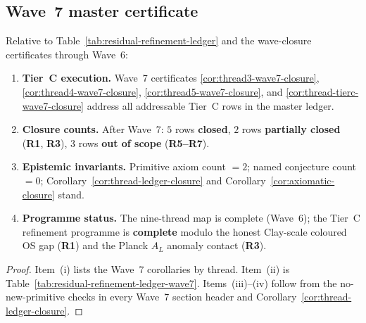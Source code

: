 \subsection{Wave~7 master certificate}
\label{sec:wave7-capstone:closure}

\begin{corollary}
\label{cor:wave7-tierc-closure}
Relative to Table~\ref{tab:residual-refinement-ledger} and the wave-closure
certificates through Wave~6:
\begin{enumerate}[label=(\roman*),leftmargin=*]
  \item \textbf{Tier~C execution.}
    Wave~7 certificates
    \ref{cor:thread3-wave7-closure},
    \ref{cor:thread4-wave7-closure},
    \ref{cor:thread5-wave7-closure},
    and \ref{cor:thread-tierc-wave7-closure}
    address all addressable Tier~C rows in the master ledger.
  \item \textbf{Closure counts.}
    After Wave~7: $5$ rows \textbf{closed}, $2$ rows \textbf{partially closed}
    (\textbf{R1}, \textbf{R3}), $3$ rows \textbf{out of scope}
    (\textbf{R5--R7}).
  \item \textbf{Epistemic invariants.}
    Primitive axiom count $=2$; named conjecture count $=0$;
    Corollary~\ref{cor:thread-ledger-closure} and
    Corollary~\ref{cor:axiomatic-closure} stand.
  \item \textbf{Programme status.}
    The nine-thread map is complete (Wave~6); the Tier~C refinement programme
    is \textbf{complete} modulo the honest Clay-scale coloured OS gap
    (\textbf{R1}) and the Planck $A_L$ anomaly contact (\textbf{R3}).
\end{enumerate}
\end{corollary}

\begin{proof}
Item~(i) lists the Wave~7 corollaries by thread.
Item~(ii) is Table~\ref{tab:residual-refinement-ledger-wave7}.
Items~(iii)--(iv) follow from the no-new-primitive checks in every Wave~7
section header and Corollary~\ref{cor:thread-ledger-closure}.
\end{proof}

